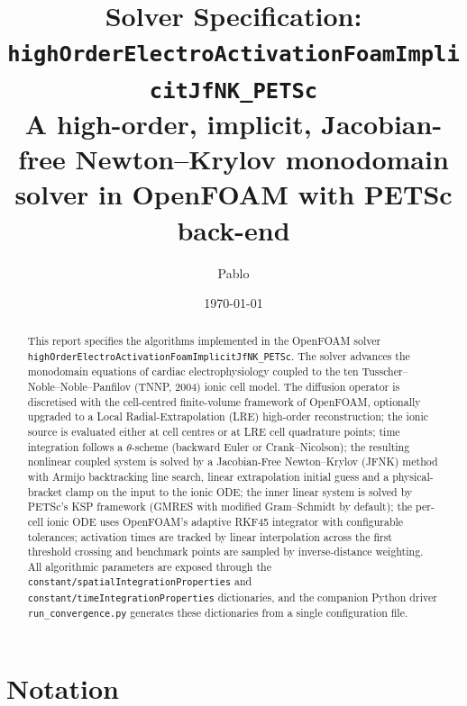 \documentclass[11pt,a4paper]{article}
\title{Solver Specification:\\
       \texorpdfstring{\texttt{highOrderElectroActivationFoamImplicitJfNK\_PETSc}}{highOrderElectroActivationFoamImplicitJfNK\_PETSc}\\
       \large A high-order, implicit, Jacobian-free Newton--Krylov
       monodomain solver in OpenFOAM with PETSc back-end}
\author{Pablo}
\date{\today}
\newcommand{\code}[1]{\texttt{\small #1}}
\begin{document}
\maketitle

\begin{abstract}
This report specifies the algorithms implemented in the OpenFOAM solver
\code{highOrderElectroActivationFoamImplicitJfNK\_PETSc}. The solver
advances the monodomain equations of cardiac electrophysiology coupled
to the ten Tusscher--Noble--Noble--Panfilov (TNNP, 2004) ionic cell
model. The diffusion operator is discretised with the cell-centred
finite-volume framework of OpenFOAM, optionally upgraded to a Local
Radial-Extrapolation (LRE) high-order reconstruction; the ionic source
is evaluated either at cell centres or at LRE cell quadrature points;
time integration follows a $\theta$-scheme (backward Euler or
Crank--Nicolson); the resulting nonlinear coupled system is solved by a
Jacobian-Free Newton--Krylov (JFNK) method with Armijo backtracking line
search, linear extrapolation initial guess and a physical-bracket clamp
on the input to the ionic ODE; the inner linear system is solved by
PETSc's KSP framework (GMRES with modified Gram--Schmidt by default);
the per-cell ionic ODE uses OpenFOAM's adaptive RKF45 integrator with
configurable tolerances; activation times are tracked by linear
interpolation across the first threshold crossing and benchmark points
are sampled by inverse-distance weighting. All algorithmic parameters
are exposed through the \code{constant/spatialIntegrationProperties}
and \code{constant/timeIntegrationProperties} dictionaries, and the
companion Python driver \code{run\_convergence.py} generates these
dictionaries from a single configuration file.
\end{abstract}

\tableofcontents
\bigskip

\section{Notation}
\end{document}
